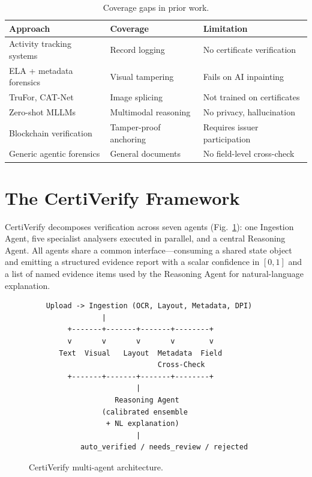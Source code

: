 \documentclass[runningheads]{llncs}
\begin{document}
\begin{table}[t]
\caption{Coverage gaps in prior work.}
\label{tab:gaps}
\centering
\begin{tabular}{lll}
\toprule
\textbf{Approach} & \textbf{Coverage} & \textbf{Limitation} \\
\midrule
Activity tracking systems & Record logging & No certificate verification \\
ELA + metadata forensics & Visual tampering & Fails on AI inpainting \\
TruFor, CAT-Net & Image splicing & Not trained on certificates \\
Zero-shot MLLMs & Multimodal reasoning & No privacy, hallucination \\
Blockchain verification & Tamper-proof anchoring & Requires issuer participation \\
Generic agentic forensics & General documents & No field-level cross-check \\
\bottomrule
\end{tabular}
\end{table}

\section{The CertiVerify Framework}
\label{sec:framework}

CertiVerify decomposes verification across seven agents (Fig.~\ref{fig:arch}): one Ingestion Agent, five specialist analysers executed in parallel, and a central Reasoning Agent. All agents share a common interface---consuming a shared state object and emitting a structured evidence report with a scalar confidence in $[0,1]$ and a list of named evidence items used by the Reasoning Agent for natural-language explanation.

\begin{figure}[t]
\centering
\begin{verbatim}
    Upload -> Ingestion (OCR, Layout, Metadata, DPI)
                 |
         +-------+-------+-------+--------+
         v       v       v       v        v
       Text  Visual   Layout  Metadata  Field
                              Cross-Check
         +-------+-------+-------+--------+
                         |
                    Reasoning Agent
                 (calibrated ensemble
                  + NL explanation)
                         |
            auto_verified / needs_review / rejected
\end{verbatim}
\caption{CertiVerify multi-agent architecture.}
\label{fig:arch}
\end{figure}
\end{document}
